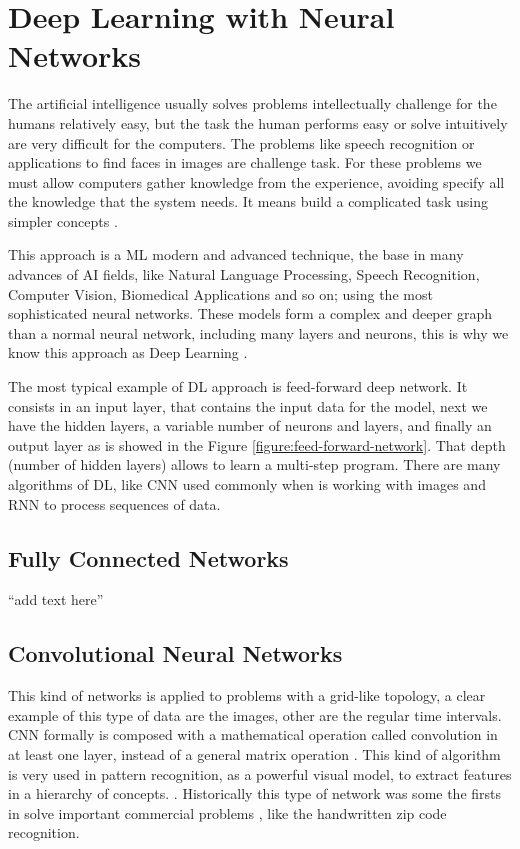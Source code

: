 \documentclass[12pt]{report}
\begin{document}
\section{Deep Learning with Neural Networks}

The artificial intelligence usually solves problems intellectually challenge for the humans relatively easy, but the task the human performs easy or solve intuitively are very difficult for the computers. The problems like speech recognition or applications to find faces in images are challenge task. For these problems we must allow computers gather knowledge from the experience, avoiding specify all the knowledge that the system needs. It means build a complicated task using simpler concepts \cite{Goodfellow2016}.

This approach is a \ac{ML} modern and advanced technique, the base in many advances of  \ac{AI} fields, like Natural Language Processing, Speech Recognition, Computer Vision, Biomedical Applications and so on; using the most sophisticated neural networks. These models form a complex and deeper graph than a normal neural network, including many layers and neurons, this is why we know this approach as Deep Learning \cite{Chandra2017} \cite{Goodfellow2016} \cite{Nevala2017}.

The most typical example of \ac{DL} approach is feed-forward deep network. It consists in an input layer, that contains the input data for the model, next we have the hidden layers, a variable number of neurons and layers, and finally an output layer as is showed in the Figure \ref{figure:feed-forward-network}. That depth (number of hidden layers) allows to learn a multi-step program. There are many algorithms of \ac{DL}, like \ac{CNN} used commonly when is working with images and \ac{RNN} to process sequences of data. 

\subsection{Fully Connected Networks}
``add text here''
\subsection{Convolutional Neural Networks}
This kind of networks is applied to problems with a grid-like topology, a clear example of this type of data are the images, other are the regular time intervals. \ac{CNN} formally is composed with a mathematical operation called convolution in at least one layer, instead of a general matrix operation \cite{Goodfellow2016}. This kind of algorithm is very used in pattern recognition, as a powerful visual model, to extract features in a hierarchy of concepts. \cite{Long2015}. Historically this type of network was some the firsts in solve important commercial problems \cite{Goodfellow2016}, like the handwritten zip code recognition.
\end{document}
